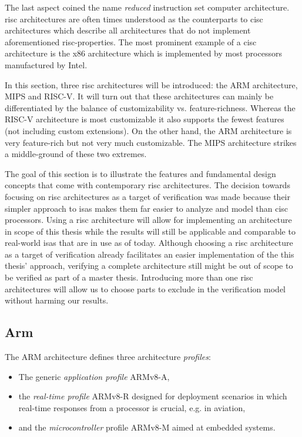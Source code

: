 The last aspect coined the name \textit{reduced} instruction set computer architecture.
\gls{risc} architectures are often times understood as the counterparts to \gls{cisc} architectures which describe all architectures that do not implement aforementioned \gls{risc}-properties.
The most prominent example of a \gls{cisc} architecture is the x86 architecture which is implemented by most processors manufactured by Intel.

In this section, three \gls{risc} architectures will be introduced: the ARM architecture, MIPS and RISC-V.
It will turn out that these architectures can mainly be differentiated by the balance of customizability vs. feature-richness.
Whereas the RISC-V architecture is most customizable it also supports the fewest features (not including custom extensions).
On the other hand, the ARM architecture is very feature-rich but not very much customizable.
The MIPS architecture strikes a middle-ground of these two extremes.

The goal of this section is to illustrate the features and fundamental design concepts that come with contemporary \gls{risc} architectures.
The decision towards focusing on \gls{risc} architectures as a target of verification was made because their simpler approach to \glspl{isa} makes them far easier to analyze and model than \gls{cisc} processors.
Using a \gls{risc} architecture will allow for implementing an architecture in scope of this thesis while the results will still be applicable and comparable to real-world \glspl{isa} that are in use as of today.
Although choosing a \gls{risc} architecture as a target of verification already facilitates an easier implementation of the this thesis' approach, verifying a complete architecture still might be out of scope to be verified as part of a master thesis.
Introducing more than one \gls{risc} architectures will allow us to choose parts to exclude in the verification model without harming our results.

\subsection{Arm}

The ARM architecture defines three architecture \textit{profiles}:
\begin{itemize}
    \item The generic \textit{application profile} ARMv8-A,
    \item the \textit{real-time profile} ARMv8-R designed for deployment scenarios in which real-time responses from a processor is crucial, e.g. in aviation,
    \item and the \textit{microcontroller} profile ARMv8-M aimed at embedded systems.
\end{itemize}


